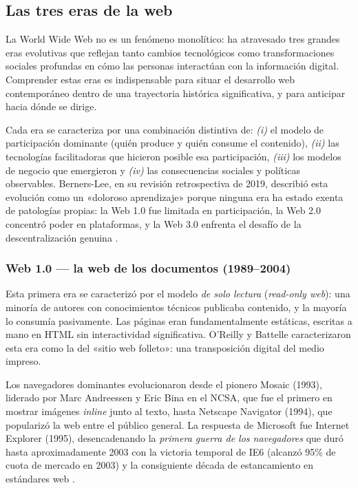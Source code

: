 \documentclass[11pt,a4paper,openany]{book}
\begin{document}
\subsection{Las tres eras de la web}

La World Wide Web no es un fenómeno monolítico: ha atravesado tres
grandes eras evolutivas que reflejan tanto cambios tecnológicos como
transformaciones sociales profundas en cómo las personas interactúan
con la información digital. Comprender estas eras es indispensable
para situar el desarrollo web contemporáneo dentro de una trayectoria
histórica significativa, y para anticipar hacia dónde se dirige.

Cada era se caracteriza por una combinación distintiva de:
\emph{(i)} el modelo de participación dominante (quién produce y quién
consume el contenido), \emph{(ii)} las tecnologías facilitadoras que
hicieron posible esa participación, \emph{(iii)} los modelos de
negocio que emergieron y \emph{(iv)} las consecuencias sociales y
políticas observables. Berners-Lee, en su revisión retrospectiva de
2019, describió esta evolución como un «doloroso aprendizaje»
porque ninguna era ha estado exenta de patologías propias: la Web 1.0
fue limitada en participación, la Web 2.0 concentró poder en
plataformas, y la Web 3.0 enfrenta el desafío de la
descentralización genuina \cite{bernerslee2019contract}.

\subsubsection{Web 1.0 --- la web de los documentos (1989--2004)}

Esta primera era se caracterizó por el modelo \emph{de solo lectura}
(\emph{read-only web}): una minoría de autores con conocimientos
técnicos publicaba contenido, y la mayoría lo consumía pasivamente.
Las páginas eran fundamentalmente estáticas, escritas a mano en HTML
sin interactividad significativa. O'Reilly y Battelle
\cite{oreilly2009web2} caracterizaron esta era como la del «sitio web
folleto»: una transposición digital del medio impreso.

Los navegadores dominantes evolucionaron desde el pionero Mosaic
(1993), liderado por Marc Andreessen y Eric Bina en el NCSA, que fue
el primero en mostrar imágenes \emph{inline} junto al texto, hasta
Netscape Navigator (1994), que popularizó la web entre el público
general. La respuesta de Microsoft fue Internet Explorer (1995),
desencadenando la \emph{primera guerra de los navegadores} que duró
hasta aproximadamente 2003 con la victoria temporal de IE6 (alcanzó
95\% de cuota de mercado en 2003) y la consiguiente década de
estancamiento en estándares web \cite{zeldman2010designing}.
\end{document}
